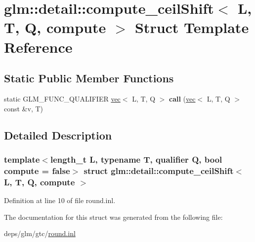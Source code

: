 \hypertarget{structglm_1_1detail_1_1compute__ceilShift}{}\section{glm\+:\+:detail\+:\+:compute\+\_\+ceil\+Shift$<$ L, T, Q, compute $>$ Struct Template Reference}
\label{structglm_1_1detail_1_1compute__ceilShift}
\subsection*{Static Public Member Functions}
\begin{DoxyCompactItemize}
\item 
\mbox{\label{structglm_1_1detail_1_1compute__ceilShift_a7ccb84201e15fd1ee3dfac02d3ffeb79}} 
static G\+L\+M\+\_\+\+F\+U\+N\+C\+\_\+\+Q\+U\+A\+L\+I\+F\+I\+ER \hyperlink{structglm_1_1vec}{vec}$<$ L, T, Q $>$ {\bfseries call} (\hyperlink{structglm_1_1vec}{vec}$<$ L, T, Q $>$ const \&v, T)
\end{DoxyCompactItemize}


\subsection{Detailed Description}
\subsubsection*{template$<$length\+\_\+t L, typename T, qualifier Q, bool compute = false$>$\newline
struct glm\+::detail\+::compute\+\_\+ceil\+Shift$<$ L, T, Q, compute $>$}



Definition at line 10 of file round.\+inl.



The documentation for this struct was generated from the following file\+:\begin{DoxyCompactItemize}
\item 
deps/glm/gtc/\hyperlink{round_8inl}{round.\+inl}\end{DoxyCompactItemize}
